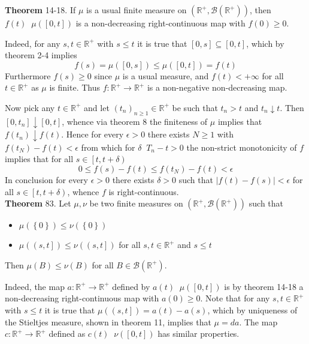 \documentclass[a4paper]{article}
\newcommand{\obj}[1]{\left\{ #1 \right \}}
\newcommand{\clo}[1]{\left [ #1 \right ]}
\newcommand{\clop}[1]{\left [ #1 \right )}
\newcommand{\ploc}[1]{\left ( #1 \right ]}
\newcommand{\brac}[1]{\left ( #1 \right )}
\newcommand{\abs}[1]{\left | #1 \right |}
\newcommand{\Real}{\mathbb{R}}
\newcommand{\borel}[1]{\mathcal{B}\brac{#1}}
\newcommand{\defn}{\mathop{\overset{\Delta}{=}}\nolimits}
\begin{document}
\label{thm:finite_meas_map}\noindent\textbf{Theorem} 14-18.
If $\mu$ is a usual finite measure on $\brac{\Real^+, \borel{\Real^+}}$, then $f\brac{t}\defn \mu\brac{\clo{0,t}}$ is a non-decreasing right-continuous map with $f\brac{0}\geq 0$.

Indeed, for any $s,t\in \Real^+$ with $s\leq t$ it is true that $\clo{0,s}\subseteq \clo{0,t}$, which by theorem 2-4 implies \[f\brac{s}=\mu\brac{\clo{0,s}}\leq \mu\brac{\clo{0,t}} = f\brac{t}\] Furthermore $f\brac{s}\geq 0$ since $\mu$ is a usual measure, and $f\brac{t}<+\infty$ for all $t\in \Real^+$ as $\mu$ is finite. Thus $f:\Real^+\to \Real^+$ is a non-negative non-decreasing map.

Now pick any $t\in \Real^+$ and let $\brac{t_n}_{n\geq1}\in \Real^+$ be such that $t_n>t$ and $t_n\downarrow t$. Then $\clo{0,t_n}\downarrow \clo{0,t}$, whence via theorem 8 the finiteness of $\mu$ implies that $f\brac{t_n}\downarrow f\brac{t}$. Hence for every $\epsilon>0$ there exists $N\geq1$ with $f\brac{t_N}-f\brac{t}<\epsilon$ from which for $\delta\defn T_n-t>0$ the non-strict monotonicity of $f$ implies that for all $s\in \clop{t,t+\delta}$ \[0\leq f\brac{s}-f\brac{t} \leq f\brac{t_N}-f\brac{t}<\epsilon\] In conclusion for every $\epsilon>0$ there exists $\delta>0$ such that $\abs{f\brac{t}-f\brac{s}}<\epsilon$ for all $s\in \clop{t, t+\delta}$, whence $f$ is right-continuous.\\

\label{thm:stieltjes_monotonicity}\noindent\textbf{Theorem} 83.
Let $\mu,\nu$ be two finite measures on $\brac{\Real^+,\borel{\Real^+}}$ such that\begin{itemize}
	\item $\mu\brac{\obj{0}}\leq \nu\brac{\obj{0}}$
	\item $\mu\brac{\ploc{s,t}}\leq \nu\brac{\ploc{s,t}}$ for all $s,t\in \Real^+$ and $s\leq t$
\end{itemize} Then $\mu\brac{B}\leq \nu\brac{B}$ for all $B\in \borel{\Real^+}$.

Indeed, the map $a:\Real^+\to \Real^+$ defined by $a\brac{t}\defn \mu\brac{\clo{0,t}}$ is by theorem 14-18 a non-decreasing right-continuous map with $a\brac{0}\geq 0$. Note that for any $s,t\in \Real^+$ with $s\leq t$ it is true that $\mu\brac{\ploc{s,t}}=a\brac{t}-a\brac{s}$, which by uniqueness of the Stieltjes measure, shown in theorem 11, implies that $\mu = da$. The map $c:\Real^+\to\Real^+$ defined as $c\brac{t}\defn \nu\brac{\clo{0,t}}$ has similar properties.
\end{document}
